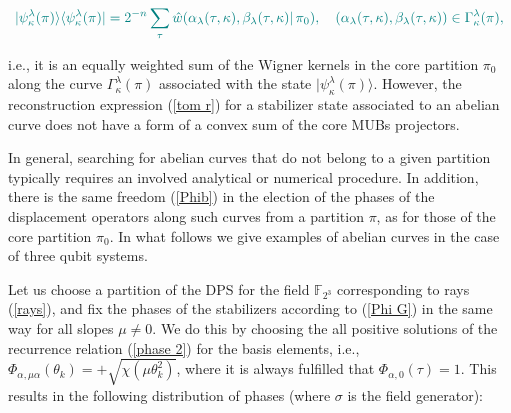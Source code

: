 \documentclass[quantumrep,article,submit,pdftex,moreauthors]{Definitions/mdpi}
\begin{document}
\begin{equation}
  \color{teal}
  |\psi_{\kappa }^{\lambda}(\pi)\rangle
  \langle \psi_{\kappa }^{\lambda }(\pi)|
  = 2^{-n} \sum_{\tau}
  \hat{w}(\alpha_{\lambda}(\tau,\kappa),\beta_{\lambda}(\tau,\kappa)|\,\pi_{0}),
  \quad \left(
    \alpha _{\lambda }(\tau ,\kappa ),\beta _{\lambda}(\tau ,\kappa )
  \right)
  \in \Gamma_{\kappa}^{\lambda}(\pi),
\end{equation}

{\color{teal}i.e., it is an equally weighted sum of the Wigner kernels in the
  core partition $\pi_{0}$ along the curve $\Gamma_{\kappa }^{\lambda}(\pi)$
  associated with the state $|\psi_{\kappa}^{\lambda }(\pi)\rangle$. However,
the reconstruction expression (\ref{tom r}) for a stabilizer state associated to
an abelian curve does not have a form of a convex sum of the core MUBs
projectors.}

In general, searching for abelian curves that do not belong to a given partition
typically requires an involved analytical or numerical procedure.  In addition,
there is the same freedom (\ref{Phib}) in the election of the phases of the
displacement operators along such curves from a partition $\pi $, as for those
of the core partition $\pi _{0}$. In what follows we give examples of abelian
curves in the case of three qubit systems.

Let us choose a partition of the DPS for the field $\mathbb{F}_{2^{3}}$
corresponding to rays (\ref{rays}), and fix the phases of the stabilizers
according to (\ref{Phi G}) in the same way for all slopes $\mu \neq 0$. We do
this by choosing the all positive solutions of the recurrence relation
(\ref{phase 2}) for the basis elements, i.e.,
$\Phi_{\alpha,\mu\alpha}(\theta_{k}) =
+\sqrt{\chi\left(\mu\theta_{k}^{2}\right)}$, where it is always fulfilled that
$\Phi_{\alpha,0}(\tau) = 1$. This results in the following distribution of
phases (where $\sigma$ is the field generator):
\end{document}
